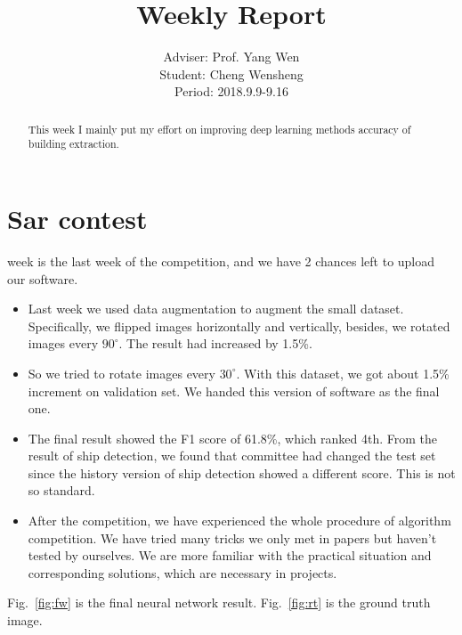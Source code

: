 \documentclass[]{IEEEtran}
\begin{document}
	\title{Weekly Report}
	\author{Adviser: Prof. Yang Wen \\Student: Cheng Wensheng\\ Period: 2018.9.9-9.16
	}
	\maketitle

\begin{abstract}
	This week I mainly put my effort on improving deep learning methods accuracy of building extraction.
\end{abstract}

\section{Sar contest}
	 week is the last week of the competition, and we have 2 chances left to upload our software.
	\begin{itemize}
		\item Last week we used data augmentation to augment the small dataset. Specifically, we flipped images horizontally and vertically, besides, we rotated images every $90^{\circ}$. The result had increased by 1.5\%. 
		\item So we tried to rotate images every $30^{\circ}$. With this dataset, we got about 1.5\% increment on validation set. We handed this version of software as the final one.
		\item The final result showed the F1 score of 61.8\%, which ranked 4th. From the result of ship detection, we found that committee had changed the test set since the history version of ship detection showed a different score. This is not so standard. 
		\item After the competition, we have experienced the whole procedure of algorithm competition. We have tried many tricks we only met in papers but haven't tested by ourselves. We are more familiar with the practical situation and corresponding solutions, which are necessary in projects.    
	\end{itemize}
	
	Fig.~\ref{fig:fw} is the final neural network result. Fig.~\ref{fig:rt} is the ground truth image.
\end{document}
